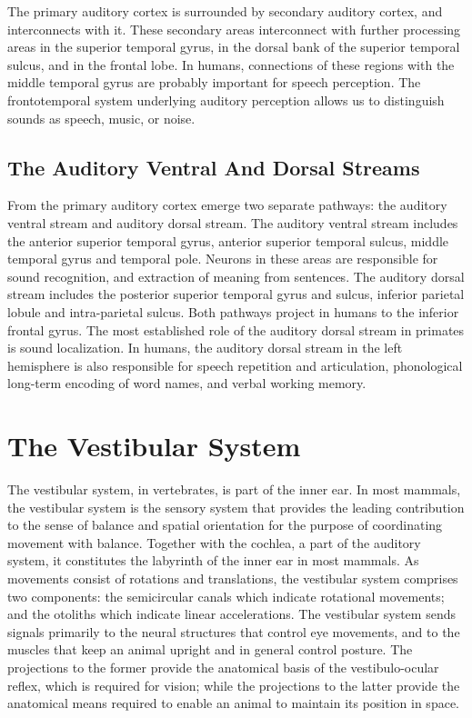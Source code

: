 \documentclass[]{book}
\begin{document}
The primary auditory cortex is surrounded by secondary auditory cortex, and interconnects with it. These secondary areas interconnect with further processing areas in the superior temporal gyrus, in the dorsal bank of the superior temporal sulcus, and in the frontal lobe. In humans, connections of these regions with the middle temporal gyrus are probably important for speech perception. The frontotemporal system underlying auditory perception allows us to distinguish sounds as speech, music, or noise.

\hypertarget{the-auditory-ventral-and-dorsal-streams}{%
\subsection{The Auditory Ventral And Dorsal Streams}\label{the-auditory-ventral-and-dorsal-streams}}

From the primary auditory cortex emerge two separate pathways: the auditory ventral stream and auditory dorsal stream. The auditory ventral stream includes the anterior superior temporal gyrus, anterior superior temporal sulcus, middle temporal gyrus and temporal pole. Neurons in these areas are responsible for sound recognition, and extraction of meaning from sentences. The auditory dorsal stream includes the posterior superior temporal gyrus and sulcus, inferior parietal lobule and intra-parietal sulcus. Both pathways project in humans to the inferior frontal gyrus. The most established role of the auditory dorsal stream in primates is sound localization. In humans, the auditory dorsal stream in the left hemisphere is also responsible for speech repetition and articulation, phonological long-term encoding of word names, and verbal working memory.

\hypertarget{the-vestibular-system}{%
\section{The Vestibular System}\label{the-vestibular-system}}

The vestibular system, in vertebrates, is part of the inner ear. In most mammals, the vestibular system is the sensory system that provides the leading contribution to the sense of balance and spatial orientation for the purpose of coordinating movement with balance. Together with the cochlea, a part of the auditory system, it constitutes the labyrinth of the inner ear in most mammals. As movements consist of rotations and translations, the vestibular system comprises two components: the semicircular canals which indicate rotational movements; and the otoliths which indicate linear accelerations. The vestibular system sends signals primarily to the neural structures that control eye movements, and to the muscles that keep an animal upright and in general control posture. The projections to the former provide the anatomical basis of the vestibulo-ocular reflex, which is required for vision; while the projections to the latter provide the anatomical means required to enable an animal to maintain its position in space.
\end{document}
